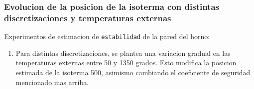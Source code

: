 \subsubsection{Evolucion de la posicion de la isoterma con distintas discretizaciones y temperaturas externas}
Experimentos de estimacion de \texttt{estabilidad} de la pared del horno:
\begin{enumerate}
    \item Para distintas discretizaciones, se plantea una variacion gradual en las temperaturas externas entre 50 y 1350 grados. Esto modifica la posicion estimada de la isoterma 500, asimismo cambiando el coeficiente de seguridad mencionado mas arriba.
\end{enumerate}